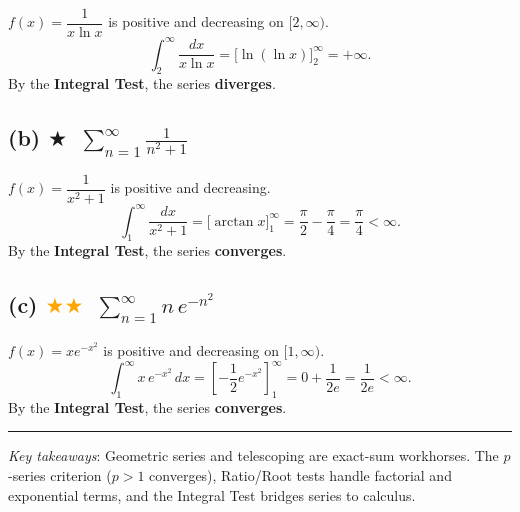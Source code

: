 \documentclass[12pt,a4paper]{article}
\newcommand{\easy}{\textcolor{green!60!black}{$\bigstar$}}
\newcommand{\medium}{\textcolor{orange}{$\bigstar\bigstar$}}
\begin{document}
$f(x)=\dfrac{1}{x\ln x}$ is positive and decreasing on $[2,\infty)$.
\[
  \int_2^{\infty}\frac{dx}{x\ln x} = \Big[\ln(\ln x)\Big]_2^{\infty} = +\infty.
\]
By the \textbf{Integral Test}, the series \textbf{diverges}.

\subsection*{(b) \easy\ $\displaystyle\sum_{n=1}^{\infty}\frac{1}{n^2+1}$}

$f(x)=\dfrac{1}{x^2+1}$ is positive and decreasing.
\[
  \int_1^{\infty}\frac{dx}{x^2+1} = \Big[\arctan x\Big]_1^{\infty} = \frac{\pi}{2} - \frac{\pi}{4} = \frac{\pi}{4} < \infty.
\]
By the \textbf{Integral Test}, the series \textbf{converges}.

\subsection*{(c) \medium\ $\displaystyle\sum_{n=1}^{\infty}n\,e^{-n^2}$}

$f(x) = xe^{-x^2}$ is positive and decreasing on $[1,\infty)$.
\[
  \int_1^{\infty} x\,e^{-x^2}\,dx
  = \left[-\frac{1}{2}e^{-x^2}\right]_1^{\infty}
  = 0 + \frac{1}{2e} = \frac{1}{2e} < \infty.
\]
By the \textbf{Integral Test}, the series \textbf{converges}.

\bigskip
\hrule
\bigskip
\textit{Key takeaways}: Geometric series and telescoping are exact-sum workhorses.  The $p$-series criterion ($p>1$ converges), Ratio/Root tests handle factorial and exponential terms, and the Integral Test bridges series to calculus.
\end{document}
